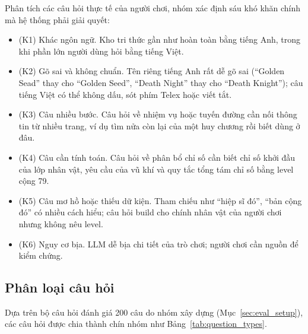 Phân tích các câu hỏi thực tế của người chơi, nhóm xác định sáu khó khăn chính mà hệ thống phải giải quyết:
\begin{itemize}
    \item (K1) Khác ngôn ngữ. Kho tri thức gần như hoàn toàn bằng tiếng Anh, trong khi phần lớn người dùng hỏi bằng tiếng Việt.
    \item (K2) Gõ sai và không chuẩn. Tên riêng tiếng Anh rất dễ gõ sai (``Golden Sead'' thay cho ``Golden Seed'', ``Death Night'' thay cho ``Death Knight''); câu tiếng Việt có thể không dấu, sót phím Telex hoặc viết tắt.
    \item (K3) Câu nhiều bước. Câu hỏi về nhiệm vụ hoặc tuyến đường cần nối thông tin từ nhiều trang, ví dụ tìm nửa còn lại của một huy chương rồi biết dùng ở đâu.
    \item (K4) Câu cần tính toán. Câu hỏi về phân bổ chỉ số cần biết chỉ số khởi đầu của lớp nhân vật, yêu cầu của vũ khí và quy tắc tổng tám chỉ số bằng level cộng 79.
    \item (K5) Câu mơ hồ hoặc thiếu dữ kiện. Tham chiếu như ``hiệp sĩ đó'', ``bản cộng đó'' có nhiều cách hiểu; câu hỏi build cho chính nhân vật của người chơi nhưng không nêu level.
    \item (K6) Nguy cơ bịa. LLM dễ bịa chi tiết của trò chơi; người chơi cần nguồn để kiểm chứng.
\end{itemize}

\subsection{Phân loại câu hỏi}
\label{sec:question_types}

Dựa trên bộ câu hỏi đánh giá 200 câu do nhóm xây dựng (Mục~\ref{sec:eval_setup}), các câu hỏi được chia thành chín nhóm như Bảng~\ref{tab:question_types}.

